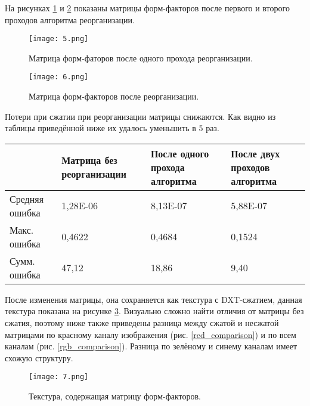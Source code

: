 \documentclass[12pt,fleqn]{article}
\begin{document}
На рисунках \ref{reorder_1} и \ref{reorder_2} показаны матрицы форм-факторов после первого и второго проходов алгоритма реорганизации.

\begin{figure}[htb]
    \centering
    \texttt{[image: 5.png]}
    \caption{Матрица форм-фаторов после одного прохода реорганизации.}
    \label{reorder_1}
\end{figure}

\pagebreak

\begin{figure}[htb]
    \centering
    \texttt{[image: 6.png]}
    \caption{Матрица форм-факторов после реорганизации.}
    \label{reorder_2}
\end{figure}

\pagebreak

Потери при сжатии при реорганизации матрицы снижаются. Как видно из таблицы приведённой ниже их удалось уменьшить в 5 раз.

\begin{center}

\begin{tabular}{|p{}|p{}|p{}|p{}|}

\hline
~ & Матрица без реорганизации & После одного прохода алгоритма & После двух проходов алгоритма \\ \hline
Средняя ошибка & 1,28E-06 & 8,13E-07 & 5,88E-07 \\ \hline
Макс. ошибка & 0,4622 & 0,4684 & 0,1524 \\ \hline
Сумм. ошибка & 47,12 & 18,86 & 9,40 \\ \hline

\end{tabular}

\end{center}

После изменения матрицы, она сохраняется как текстура с DXT-сжатием, данная текстура показана на рисунке \ref{ff_texture}. Визуально сложно найти отличия от матрицы без сжатия, поэтому ниже также приведены разница между сжатой и несжатой матрицами по красному каналу изображения (рис. \ref{red_comparison}) и по всем каналам (рис. \ref{rgb_comparison}). Разница по зелёному и синему каналам имеет схожую структуру.

\begin{figure}[htb]
    \centering
    \texttt{[image: 7.png]}
    \caption{Текстура, содержащая матрицу форм-факторов.}
    \label{ff_texture}
\end{figure}
\end{document}
